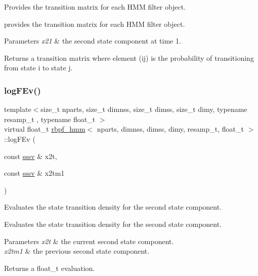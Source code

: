 Provides the transition matrix for each H\+MM filter object. 

provides the transition matrix for each H\+MM filter object. 
\begin{DoxyParams}{Parameters}
{\em x21} & the second state component at time 1. \\
\hline
\end{DoxyParams}
\begin{DoxyReturn}{Returns}
a transition matrix where element (ij) is the probability of transitioning from state i to state j. 
\end{DoxyReturn}
\mbox{\label{classrbpf__hmm_a4ae74e05f31f74d26be47da29fc0ed96}} 
\subsubsection{\texorpdfstring{log\+F\+Ev()}{logFEv()}}
{\footnotesize\ttfamily template$<$size\+\_\+t nparts, size\+\_\+t dimnss, size\+\_\+t dimss, size\+\_\+t dimy, typename resamp\+\_\+t , typename float\+\_\+t $>$ \\
virtual float\+\_\+t \hyperlink{classrbpf__hmm}{rbpf\+\_\+hmm}$<$ nparts, dimnss, dimss, dimy, resamp\+\_\+t, float\+\_\+t $>$\+::log\+F\+Ev (\begin{DoxyParamCaption}\item[{const \hyperlink{classrbpf__hmm_a28e8ad1d93bcf53cb74603f74826a81c}{sssv} \&}]{x2t,  }\item[{const \hyperlink{classrbpf__hmm_a28e8ad1d93bcf53cb74603f74826a81c}{sssv} \&}]{x2tm1 }\end{DoxyParamCaption})\hspace{0.3cm}{\ttfamily [pure virtual]}}



Evaluates the state transition density for the second state component. 

Evaluates the state transition density for the second state component. 
\begin{DoxyParams}{Parameters}
{\em x2t} & the current second state component. \\
\hline
{\em x2tm1} & the previous second state component. \\
\hline
\end{DoxyParams}
\begin{DoxyReturn}{Returns}
a float\+\_\+t evaluation. 
\end{DoxyReturn}
\mbox{\label{classrbpf__hmm_af744e8a4961b5b51b7aea6ce515e0780}} 
